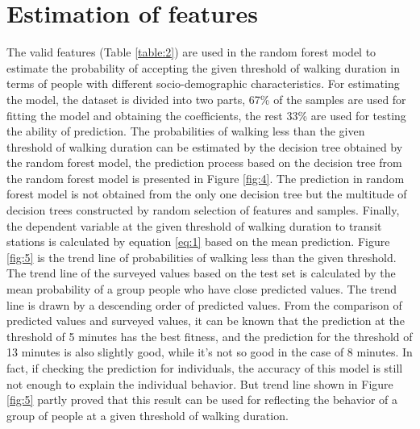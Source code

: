 \documentclass[Journal,letterpaper]{ascelike-new}
\begin{document}
\section{Estimation of features}
The valid features (Table \ref{table:2}) are used in the random forest model to estimate the probability of accepting the given threshold of walking duration in terms of people with different socio-demographic characteristics. For estimating the model, the dataset is divided into two parts, 67\% of the samples are used for fitting the model and obtaining the coefficients, the rest 33\% are used for testing the ability of prediction. The probabilities of walking less than the given threshold of walking duration can be estimated by the decision tree obtained by the random forest model, the prediction process based on the decision tree from the random forest model is presented in Figure \ref{fig:4}. The prediction in random forest model is not obtained from the only one decision tree but the multitude of decision trees constructed by random selection of features and samples. Finally, the dependent variable at the given threshold of walking duration to transit stations is calculated by equation \ref{eq:1} based on the mean prediction.
%
Figure \ref{fig:5} is the trend line of probabilities of walking less than the given threshold. The trend line of the surveyed values based on the test set is calculated by the mean probability of a group people who have close predicted values. The trend line is drawn by a descending order of predicted values. From the comparison of predicted values and surveyed values, it can be known that the prediction at the threshold of 5 minutes has the best fitness, and the prediction for the threshold of 13 minutes is also slightly good, while it’s not so good in the case of 8 minutes. In fact, if checking the prediction for individuals, the accuracy of this model is still not enough to explain the individual behavior. But trend line shown in Figure \ref{fig:5} partly proved that this result can be used for reflecting the behavior of a group of people at a given threshold of walking duration.
%
\end{document}
